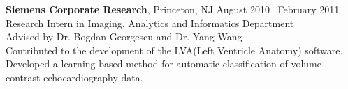     \textbf{Siemens Corporate Research}, Princeton, NJ \hfill August 2010 \textendash ~February 2011\vspace{0mm}\\\vspace{0mm}
	\hspace{-1mm}Research Intern in Imaging, Analytics and Informatics Department  \hfill \vspace{0mm}\\\vspace{0mm}
	\hspace{-1mm}Advised by Dr. Bogdan Georgescu and Dr. Yang Wang \hfill \vspace{2mm}\\\vspace{0mm}
	\hspace{-1.4mm}Contributed to the development of the LVA(Left Ventricle Anatomy) software. Developed a learning based method for automatic classification of volume contrast echocardiography data.